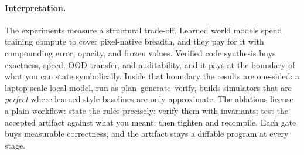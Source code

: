 \documentclass[11pt]{article}
\begin{document}
\paragraph{Interpretation.} The experiments measure a structural trade-off.
Learned world models spend training compute to cover pixel-native breadth, and they pay
for it with compounding error, opacity, and frozen values. Verified code synthesis
buys exactness, speed, OOD transfer, and auditability, and it pays at the
boundary of what you can state symbolically. Inside that boundary the
results are one-sided: a laptop-scale local model, run as
plan--generate--verify, builds simulators that are \emph{perfect} where
learned-style baselines are only approximate. The ablations license a plain workflow:
state the rules precisely; verify them with invariants; test the accepted
artifact against what you meant; then tighten and recompile. Each gate buys measurable
correctness, and the artifact stays a diffable program at every stage.
\end{document}
